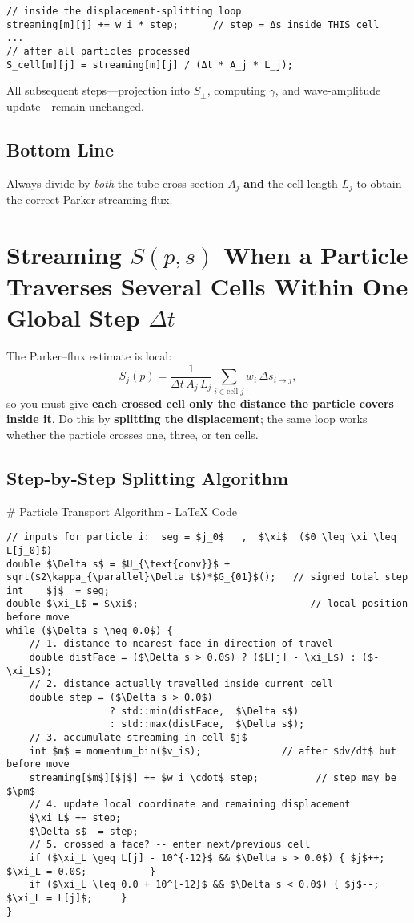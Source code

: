 \begin{verbatim}
// inside the displacement-splitting loop
streaming[m][j] += w_i * step;      // step = Δs inside THIS cell
...
// after all particles processed
S_cell[m][j] = streaming[m][j] / (Δt * A_j * L_j);
\end{verbatim}

All subsequent steps—projection into $S_\pm$, computing $\gamma$, and wave-amplitude update—remain unchanged.

\subsection*{Bottom Line}

Always divide by \emph{both} the tube cross-section $A_j$ \textbf{and} the cell length $L_j$ to obtain the correct Parker streaming flux.


\section*{Streaming $S(p,s)$ When a Particle Traverses Several Cells Within One Global Step $\Delta t$}

The Parker–flux estimate is local:
\[
S_j(p) =
\frac{1}{\Delta t\,A_j\,L_j}
\sum_{i\in\text{cell }j}
w_i\,\Delta s_{i\to j},
\]
so you must give \textbf{each crossed cell only the distance the particle covers inside it}. Do this by \textbf{splitting the displacement}; the same loop works whether the particle crosses one, three, or ten cells.

\subsection*{Step-by-Step Splitting Algorithm}

# Particle Transport Algorithm - LaTeX Code

\begin{lstlisting}
// inputs for particle i:  seg = $j_0$   ,  $\xi$  ($0 \leq \xi \leq L[j_0]$)
double $\Delta s$ = $U_{\text{conv}}$ + sqrt($2\kappa_{\parallel}\Delta t$)*$G_{01}$();   // signed total step
int    $j$  = seg;
double $\xi_L$ = $\xi$;                              // local position before move
while ($\Delta s \neq 0.0$) {
    // 1. distance to nearest face in direction of travel
    double distFace = ($\Delta s > 0.0$) ? ($L[j] - \xi_L$) : ($-\xi_L$);
    // 2. distance actually travelled inside current cell
    double step = ($\Delta s > 0.0$)
                  ? std::min(distFace,  $\Delta s$)
                  : std::max(distFace,  $\Delta s$);
    // 3. accumulate streaming in cell $j$
    int $m$ = momentum_bin($v_i$);              // after $dv/dt$ but before move
    streaming[$m$][$j$] += $w_i \cdot$ step;          // step may be $\pm$
    // 4. update local coordinate and remaining displacement
    $\xi_L$ += step;
    $\Delta s$ -= step;
    // 5. crossed a face? -- enter next/previous cell
    if ($\xi_L \geq L[j] - 10^{-12}$ && $\Delta s > 0.0$) { $j$++; $\xi_L = 0.0$;           }
    if ($\xi_L \leq 0.0 + 10^{-12}$ && $\Delta s < 0.0$) { $j$--; $\xi_L = L[j]$;     }
}
\end{lstlisting}


